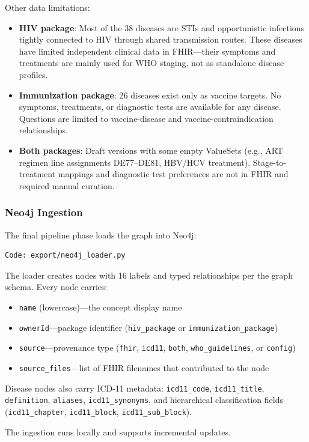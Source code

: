 Other data limitations:
\begin{itemize}
    \item \textbf{HIV package}: Most of the 38 diseases are STIs and opportunistic infections tightly connected to HIV through shared transmission routes. These diseases have limited independent clinical data in FHIR---their symptoms and treatments are mainly used for WHO staging, not as standalone disease profiles.
    \item \textbf{Immunization package}: 26 diseases exist only as vaccine targets. No symptoms, treatments, or diagnostic tests are available for any disease. Questions are limited to vaccine-disease and vaccine-contraindication relationships.
    \item \textbf{Both packages}: Draft versions with some empty ValueSets (e.g., ART regimen line assignments DE77--DE81, HBV/HCV treatment). Stage-to-treatment mappings and diagnostic test preferences are not in FHIR and required manual curation.
\end{itemize}

\subsubsection{Neo4j Ingestion}

The final pipeline phase loads the graph into Neo4j:
\begin{verbatim}
Code: export/neo4j_loader.py
\end{verbatim}

The loader creates nodes with 16 labels and typed relationships per the graph schema. Every node carries:
\begin{itemize}
    \item \texttt{name} (lowercase)---the concept display name
    \item \texttt{ownerId}---package identifier (\texttt{hiv\_package} or \texttt{immunization\_package})
    \item \texttt{source}---provenance type (\texttt{fhir}, \texttt{icd11}, \texttt{both}, \texttt{who\_guidelines}, or \texttt{config})
    \item \texttt{source\_files}---list of FHIR filenames that contributed to the node
\end{itemize}

Disease nodes also carry ICD-11 metadata: \texttt{icd11\_code}, \texttt{icd11\_title}, \texttt{definition}, \texttt{aliases}, \texttt{icd11\_synonyms}, and hierarchical classification fields (\texttt{icd11\_chapter}, \texttt{icd11\_block}, \texttt{icd11\_sub\_block}).

The ingestion runs locally and supports incremental updates.
